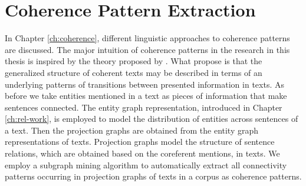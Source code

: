 \section{Coherence Pattern Extraction}
\label{sec:pattern-extraction}

In Chapter \ref{ch:coherence}, different linguistic approaches to coherence patterns are discussed. 
The major intuition of coherence patterns in the research in this thesis is inspired by the theory proposed by . 
What  propose is that the generalized structure of coherent texts may be described in terms of an underlying patterns of transitions between presented information in texts.  
As before we take entities mentioned in a text as pieces of information that make sentences connected. 
The entity graph representation, introduced in Chapter \ref{ch:rel-work}, is employed to model the distribution of entities across sentences of a text. 
Then the projection graphs are obtained from the entity graph representations of texts. 
Projection graphs model the structure of sentence relations, which are obtained based on the coreferent mentions, in texts. 
We employ a subgraph mining algorithm to automatically extract all connectivity patterns occurring in projection graphs of texts in a corpus as coherence patterns.   


